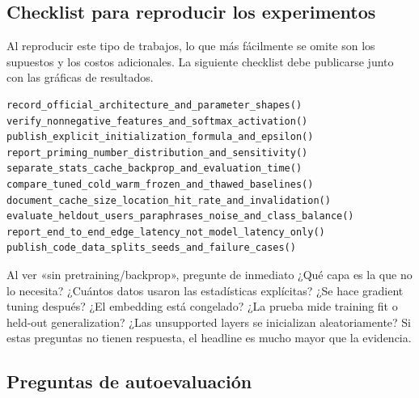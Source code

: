 \documentclass[a4paper]{article}
\begin{document}
\subsection{Checklist para reproducir los experimentos}

Al reproducir este tipo de trabajos, lo que más fácilmente se omite son los supuestos y los costos adicionales. La siguiente checklist debe publicarse junto con las gráficas de resultados.

\begin{lstlisting}[caption={Lista de reproducción y publicación de SAFFU/PLM}]
record_official_architecture_and_parameter_shapes()
verify_nonnegative_features_and_softmax_activation()
publish_explicit_initialization_formula_and_epsilon()
report_priming_number_distribution_and_sensitivity()
separate_stats_cache_backprop_and_evaluation_time()
compare_tuned_cold_warm_frozen_and_thawed_baselines()
document_cache_size_location_hit_rate_and_invalidation()
evaluate_heldout_users_paraphrases_noise_and_class_balance()
report_end_to_end_edge_latency_not_model_latency_only()
publish_code_data_splits_seeds_and_failure_cases()
\end{lstlisting}

\begin{warningbox}{Al ver «sin pretraining/backprop», pregunte de inmediato}
¿Qué capa es la que no lo necesita? ¿Cuántos datos usaron las estadísticas explícitas? ¿Se hace gradient tuning después? ¿El embedding está congelado? ¿La prueba mide training fit o held-out generalization? ¿Las unsupported layers se inicializan aleatoriamente? Si estas preguntas no tienen respuesta, el headline es mucho mayor que la evidencia.
\end{warningbox}

\subsection{Preguntas de autoevaluación}
\end{document}
